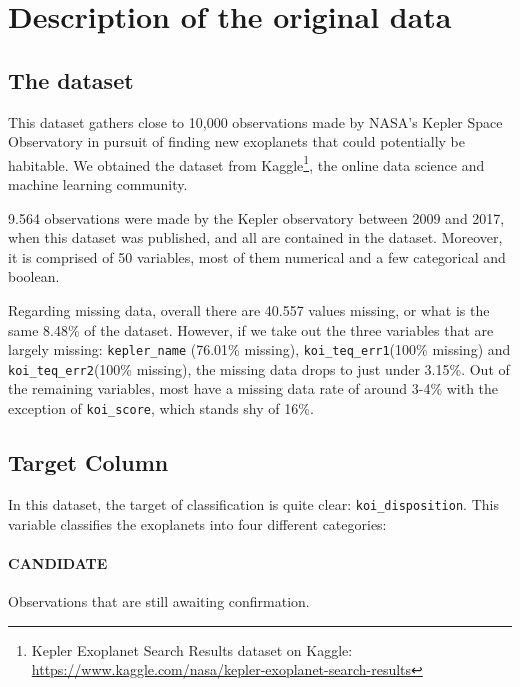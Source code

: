 
\section{Description of the original data}%
\label{sec:desc-orig}



\subsection{The dataset}

This dataset gathers close to 10,000 observations made by NASA's 
Kepler Space Observatory in pursuit of finding new exoplanets that
could potentially be habitable. 
We obtained the dataset from Kaggle\footnote{Kepler Exoplanet Search Results 
dataset on Kaggle:
\url{https://www.kaggle.com/nasa/kepler-exoplanet-search-results}},
the online data science and machine learning community.

9.564 observations were made by the Kepler observatory between 2009 and
2017, when this dataset was published, and all are contained in the dataset.
Moreover, it is comprised of 50 variables, most of them numerical and a few
categorical and boolean.

Regarding missing data, overall there are 40.557 values
missing, or what is the same 8.48\% of the dataset. However, if we take out the
three variables that are largely missing: \texttt{kepler\_name}
(76.01\% missing), \texttt{koi\_teq\_err1}(100\% missing) and 
\texttt{koi\_teq\_err2}(100\% missing), the missing data drops
to just under 3.15\%. Out of the remaining variables, most have a missing
data rate of around 3-4\% with the exception of \texttt{koi\_score}, which
stands shy of 16\%.

\subsection{Target Column}

In this dataset, the target of classification is quite clear:
\texttt{koi\_disposition}. This variable classifies the exoplanets into
four different categories:

    \paragraph{CANDIDATE} Observations that are still awaiting confirmation.
    
